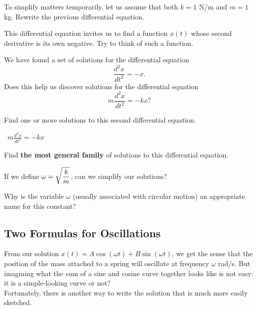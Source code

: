 \documentclass[12pt]{amsart}
\begin{document}
\newpage
\begin{problem}
  
  To simplify matters temporarily, let us assume that both
  $k = 1 $ N/m and $m = 1$ kg. Rewrite the previous differential
  equation.
\end{problem}
\vfill

 This differential equation invites us to find a function
$x(t)$ whose second derivative is its own negative.  Try to think of
such a function.
\vfill

\newpage

We have found a set of solutions for the differential equation
$$\displaystyle\frac{d^2x}{dt^2}= - x.$$ Does this help us discover
solutions for the differential equation 
$$m\frac{d^2x}{dt^2}= - kx?$$  

\begin{problem}
  
 Find one or more solutions to this second differential equation.
\end{problem}
\vfill

\newpage
~\hfill$m\frac{d^2x}{dt^2}= - kx$

\newpage
\begin{problem}
  Find {\bf the most general family} of solutions to this
  differential equation.
\end{problem}


\newpage
\begin{problem}
 If we define $\displaystyle \omega = \sqrt{\frac{k}{m}}$, can we simplify our solutions?
\end{problem}
\vfill

 Why is the variable $\omega$ (usually associated with circular motion) an appropriate name for this constant?
\vfill

\newpage
{}
\subsection*{Two Formulas for Oscillations}

From our solution $x(t) = A \cos(\omega t) + B \sin(\omega t)$, we get
the sense that the position of the mass attached to a spring will
oscillate at frequency $\omega$ rad/s. But imagining what the sum of a
sine and cosine curve together looks like is not easy: it is a
simple-looking curve or not?  
\\ 
Fortunately, there is another way to
write the solution that is much more easily sketched.
\end{document}
